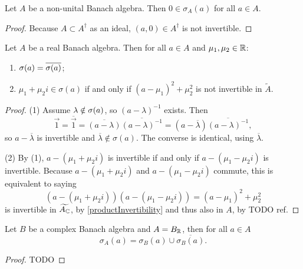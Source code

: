 \begin{lemma}
Let $A$ be a non-unital Banach algebra. Then $0\in\sigma_A(a)$ for all $a\in A$.
\end{lemma}
\begin{proof}
Because $A\subset A^\dagger$ as an ideal, $(a,0)\in A^\dagger$ is not invertible.
\end{proof}

\begin{lemma}
Let $A$ be a real Banach algebra. Then for all $a\in A$ and $\mu_1,\mu_2\in \mathbb{R}$:
\begin{enumerate}
\item $\sigma(a) = \overline{\sigma(a)}$;
\item $\mu_1 + \mu_2 i \in \sigma(a)$ \textup{if and only if} $(a-\mu_1)^2+\mu_2^2$ is not invertible in $\tilde{A}$.
\end{enumerate}
\end{lemma}
\begin{proof}
(1) Assume $\lambda \notin \sigma(a)$, so $(a-\lambda)^{-1}$ exists. Then
\[ \vec{1} = \overline{\vec{1}} = \overline{(a-\lambda)}\overline{(a-\lambda)^{-1}} = (a-\overline{\lambda})\overline{(a-\lambda)^{-1}}, \]
so $a-\overline{\lambda}$ is invertible and $\overline{\lambda}\notin \sigma(a)$. The converse is identical, using $\overline{\lambda}$.

(2) By (1), $a - (\mu_1 + \mu_2 i)$ is invertible if and only if $a - (\mu_1 - \mu_2 i)$ is invertible. Because $a - (\mu_1 + \mu_2 i)$ and $a - (\mu_1 - \mu_2 i)$ commute, this is equivalent to saying
\[ (a - (\mu_1 + \mu_2 i))(a - (\mu_1 - \mu_2 i)) = (a-\mu_1)^2 + \mu_2^2 \]
is invertible in $\widetilde{A_{\mathbb{C}}}$, by \ref{productInvertibility} and thus also in $A$, by TODO ref.
\end{proof}

\begin{proposition}
Let $B$ be a complex Banach algebra and $A = B_{\mathbb{R}}$, then for all $a\in A$
\[ \sigma_A(a) = \sigma_B(a) \cup \overline{\sigma_B(a)}. \]
\end{proposition}
\begin{proof}
TODO
\end{proof}

